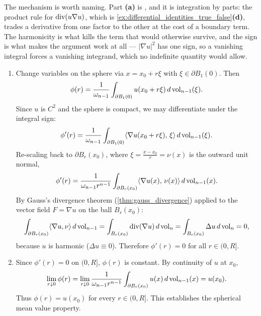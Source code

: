 \begin{exercisesolution}
\begin{remark}
The mechanism is worth naming. Part \textbf{(a)} is , and it is
integration by parts: the product rule for $\operatorname{div}(u\nabla u)$, which is
\cref{ex:differential_identities_true_false}\textbf{(d)}, trades a derivative from one factor to
the other at the cost of a boundary term. The harmonicity is what kills the term that would
otherwise survive, and the sign is what makes the argument work at all --- $\lvert\nabla
u\rvert^2$ has one sign, so a vanishing integral forces a vanishing integrand, which no
indefinite quantity would allow.
\end{remark}
\end{exercisesolution}

\begin{exercisesolution}
\label{sol:harmonic_mean_value_maximum_principle}
\begin{enumerate}[label=\textbf{(\alph*)}]
  \item Change variables on the sphere via $x = x_0 + r\xi$ with $\xi \in \partial B_1(0)$. Then
    \[\phi(r) = \frac{1}{\omega_{n-1}} \int_{\partial B_1(0)} u(x_0 + r\xi) \, d\operatorname{vol}_{n-1}(\xi).\]
    Since $u$ is $C^2$ and the sphere is compact, we may differentiate under the integral sign:
    \[\phi'(r) = \frac{1}{\omega_{n-1}} \int_{\partial B_1(0)} \langle \nabla u(x_0 + r\xi),\, \xi \rangle \, d\operatorname{vol}_{n-1}(\xi).\]
    Re-scaling back to $\partial B_r(x_0)$, where $\xi = \frac{x - x_0}{r} = \nu(x)$ is the outward unit normal,
    \[\phi'(r) = \frac{1}{\omega_{n-1} r^{n-1}} \int_{\partial B_r(x_0)} \langle \nabla u(x),\, \nu(x) \rangle \, d\operatorname{vol}_{n-1}(x).\]
    By Gauss's divergence theorem (\cref{thm:gauss_divergence}) applied to the vector field $F = \nabla u$ on the ball $B_r(x_0)$:
    \[\int_{\partial B_r(x_0)} \langle \nabla u, \nu \rangle \, d\operatorname{vol}_{n-1} = \int_{B_r(x_0)} \operatorname{div}(\nabla u) \, d\operatorname{vol}_n = \int_{B_r(x_0)} \Delta u \, d\operatorname{vol}_n = 0,\]
    because $u$ is harmonic ($\Delta u \equiv 0$). Therefore $\phi'(r) = 0$ for all $r \in (0, R]$.

  \item Since $\phi'(r) = 0$ on $(0, R]$, $\phi(r)$ is constant. By continuity of $u$ at $x_0$,
    \[\lim_{r \downarrow 0} \phi(r) = \lim_{r \downarrow 0} \frac{1}{\omega_{n-1} r^{n-1}} \int_{\partial B_r(x_0)} u(x) \, d\operatorname{vol}_{n-1}(x) = u(x_0).\]
    Thus $\phi(r) = u(x_0)$ for every $r \in (0, R]$. This establishes the spherical mean value property.


\end{enumerate}
\end{exercisesolution}
